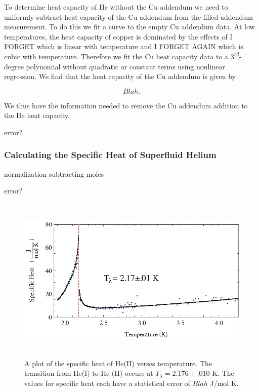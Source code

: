 To determine heat capacity of He without the Cu addendum we need to uniformly subtract heat capacity of the Cu addendum from the filled addendum measurement.  To do this we fit a curve to the empty Cu addendum data.  At low temperatures, the heat capacity of copper is dominated by the effects of I FORGET which is linear with temperature and I FORGET AGAIN which is cubic with temperature.  Therefore we fit the Cu heat capacity data to a $3^{rd}$-degree polynomial without  quadratic or constant terms using nonlinear regression.  We find that the heat capacity of the Cu addendum is given by

\begin{center}
\begin{equation}\label{eq:cufit}
Blah.
\end{equation}
\end{center}

We thus have the information needed to remove the Cu addendum addition to the He heat capacity.


error?

\subsubsection{Calculating the Specific Heat of Superfluid Helium}\label{calculatingthespecificheatofsuperfluidhelium}



normalization
	subtracting
	moles
	
error?

\begin{figure}[htbp]
\begin{center}
\includegraphics[height=80mm]{./figures/lambdatrans.eps}
\caption{\small{A plot of the specific heat of He(II) verses temperature. The transition from He(I) to He (II) occurs at $T_{\lambda} = 2.176 \pm .010$ K.  The values for specific heat each have a statistical error of $Blah$ J/mol K.}}
\label{fig:lambdatrans}
\end{center}
\end{figure}

